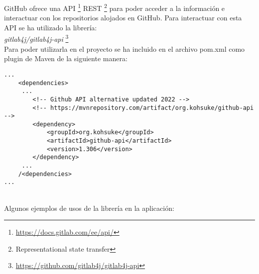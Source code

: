 GitHub ofrece una API \footnote{\url{https://docs.gitlab.com/ee/api/}} REST \footnote{Representational state transfer} para poder acceder a la información e interactuar con los repositorios alojados en GitHub. Para interactuar con esta API se ha utilizado la librería:\\

\textit{gitlab4j/gitlab4j-api} \footnote{\url{https://github.com/gitlab4j/gitlab4j-api}}\\
Para poder utilizarla en el proyecto se ha incluido en el archivo pom.xml como plugin de Maven de la siguiente manera:

\begin{minipage}{\linewidth}
{\tiny
\begin{verbatim}
...
	<dependencies>
	 ...
		<!-- Github API alternative updated 2022 -->
		<!-- https://mvnrepository.com/artifact/org.kohsuke/github-api -->
		<dependency>
			<groupId>org.kohsuke</groupId>
			<artifactId>github-api</artifactId>
			<version>1.306</version>
		</dependency>
	 ...
	/<dependencies>
...
\end{verbatim}
}
\end{minipage}\\

\newpage
Algunos ejemplos de usos de la librería en la aplicación:

